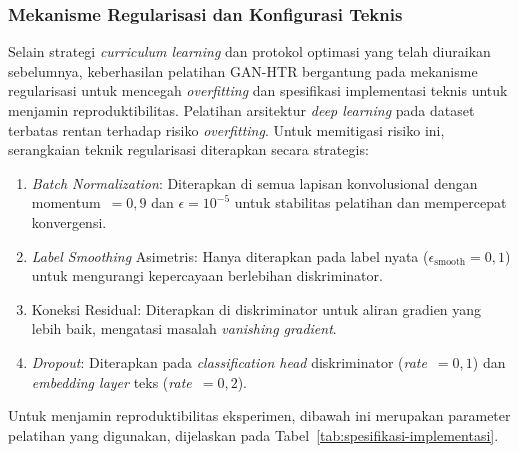 \subsubsection{Mekanisme Regularisasi dan Konfigurasi Teknis}
\label{subsubsec:stabilitas-regularisasi}

Selain strategi \textit{curriculum learning} dan protokol optimasi yang telah diuraikan sebelumnya, keberhasilan pelatihan GAN-HTR bergantung pada mekanisme regularisasi untuk mencegah \textit{overfitting} dan spesifikasi implementasi teknis untuk menjamin reproduktibilitas. Pelatihan arsitektur \textit{deep learning} pada dataset terbatas rentan terhadap risiko \textit{overfitting}. Untuk memitigasi risiko ini, serangkaian teknik regularisasi diterapkan secara strategis:

\begin{enumerate}[label=\alph*., leftmargin=1.5em, labelsep=0.5em, itemindent=0pt, noitemsep, topsep=0pt]
  \item \textit{Batch Normalization}: Diterapkan di semua lapisan konvolusional dengan momentum~$=0,9$ dan $\epsilon=10^{-5}$ untuk stabilitas pelatihan dan mempercepat konvergensi.

  \item \textit{Label Smoothing} Asimetris: Hanya diterapkan pada label nyata ($\epsilon_{\text{smooth}}=0,1$) untuk mengurangi kepercayaan berlebihan diskriminator.

  \item Koneksi Residual: Diterapkan di diskriminator untuk aliran gradien yang lebih baik, mengatasi masalah \textit{vanishing gradient}.

  \item \textit{Dropout}: Diterapkan pada \textit{classification head} diskriminator (\textit{rate}~$=0,1$) dan \textit{embedding layer} teks (\textit{rate}~$=0,2$).
\end{enumerate}

Untuk menjamin reproduktibilitas eksperimen, dibawah ini merupakan parameter pelatihan yang digunakan, dijelaskan pada Tabel~\ref{tab:spesifikasi-implementasi}.

